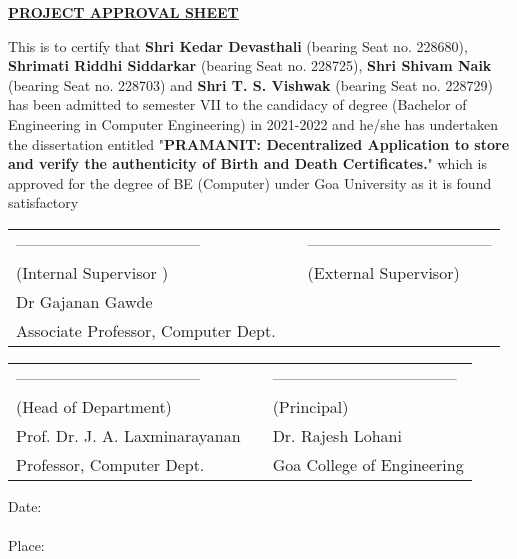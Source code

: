 \begin{center}
\underline{\bfseries \huge PROJECT APPROVAL SHEET}\\
\vspace{1cm}
\end{center}
\noindent This is to certify that \textbf{Shri Kedar Devasthali} (bearing Seat no. 228680), \textbf{Shrimati Riddhi Siddarkar} (bearing Seat no. 228725), \textbf{Shri Shivam Naik} (bearing Seat no. 228703) and \textbf{Shri T. S. Vishwak} (bearing Seat no. 228729) has been admitted to semester VII to the candidacy of degree (Bachelor of Engineering in Computer Engineering) in 2021-2022 and he/she has undertaken the dissertation entitled "\textbf{PRAMANIT: Decentralized Application to store and verify the authenticity of Birth and Death Certificates.}" which is approved for the degree of BE (Computer) under Goa University as it is found satisfactory

\vspace{2.8cm}

\begin{table}[H]
	\begin{center}
\begin{tabular}{lcl}
	\noindent ----------------------------------- &\hspace{1cm}&  ----------------------------------- \\
	(Internal Supervisor ) & \hspace{3cm} & (External Supervisor) \\
Dr Gajanan Gawde & \hspace{3cm}   \\
Associate Professor, Computer Dept. & \hspace{3cm}  \\
\end{tabular}
\end{center}
\end{table}

\vspace{2.5cm}

\begin{table}[H]
	\begin{center}
		\begin{tabular}{lcl}
			\noindent ----------------------------------- &\hspace{1cm}&  ----------------------------------- \\
		(Head of Department) & \hspace{3cm} & (Principal) \\
		Prof. Dr. J. A. Laxminarayanan & \hspace{3cm} &Dr. Rajesh Lohani \\
		Professor, Computer Dept. & \hspace{3cm} & Goa College of Engineering \\
		\end{tabular}
		\end{center}
\end{table}

\vspace{2cm}

\noindent Date: \\
\\
\noindent Place: \\


